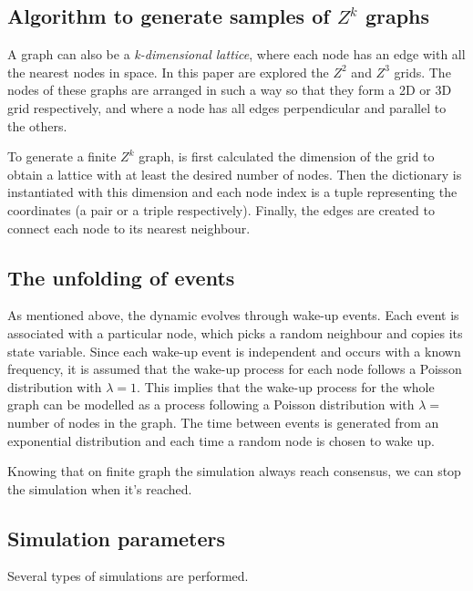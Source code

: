 \documentclass[conference]{IEEEtran}
\begin{document}
    \subsection{Algorithm to generate samples of $Z^k$ graphs}

        A graph can also be a \textit{k-dimensional lattice}, where each node has an edge with all the nearest nodes in space. 
        In this paper are explored the $Z^2$ and $Z^3$ grids. 
        The nodes of these graphs are arranged in such a way so that they form a 2D or 3D grid respectively, and where a node has all edges perpendicular and parallel to the others.

        To generate a finite $Z^k$ graph, is first calculated the dimension of the grid to obtain a lattice with at least the desired number of nodes.
        Then the dictionary is instantiated with this dimension and each node index is a tuple representing the coordinates (a pair or a triple respectively).
        Finally, the edges are created to connect each node to its nearest neighbour. 

    \subsection{The unfolding of events}

        As mentioned above, the dynamic evolves through wake-up events.
        Each event is associated with a particular node, which picks a random neighbour and copies its state variable. 
        Since each wake-up event is independent and occurs with a known frequency, it is assumed that the wake-up process for each node follows a Poisson distribution with $\lambda = 1$. 
        This implies that the wake-up process for the whole graph can be modelled as a process following a Poisson distribution with $\lambda =$ number of nodes in the graph.
        The time between events is generated from an exponential distribution and each time a random node is chosen to wake up.

        Knowing that on finite graph the simulation always reach consensus, we can stop the simulation when it's reached. 

    \subsection{Simulation parameters}
        
    Several types of simulations are performed.
    
\end{document}
